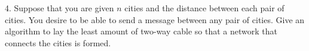 \documentclass{scrartcl}
\begin{document}
\begin{flushleft}
    \newpage
    4. Suppose that you are given $n$ cities and the distance between each pair of cities. You
    desire to be able to send a message between any pair of cities. Give an algorithm to lay the
    least amount of two-way cable so that a network that connects the cities is formed.

\end{flushleft}
\end{document}

